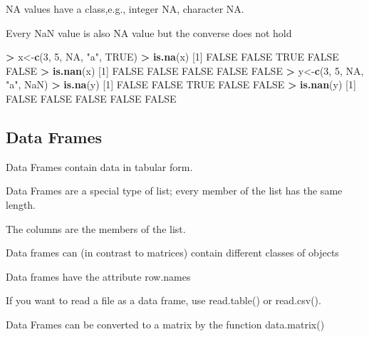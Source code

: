 \documentclass[]{article}
\newenvironment{Shaded}{\begin{snugshade}}{\end{snugshade}}
\newcommand{\KeywordTok}[1]{\textcolor[rgb]{0.13,0.29,0.53}{\textbf{#1}}}
\newcommand{\DecValTok}[1]{\textcolor[rgb]{0.00,0.00,0.81}{#1}}
\newcommand{\StringTok}[1]{\textcolor[rgb]{0.31,0.60,0.02}{#1}}
\newcommand{\OtherTok}[1]{\textcolor[rgb]{0.56,0.35,0.01}{#1}}
\newcommand{\OperatorTok}[1]{\textcolor[rgb]{0.81,0.36,0.00}{\textbf{#1}}}
\newcommand{\NormalTok}[1]{#1}
\begin{document}
NA values have a class,e.g., integer NA, character NA.

Every NaN value is also NA value but the converse does not hold

\begin{Shaded}
\begin{Highlighting}[]
\OperatorTok{>}\StringTok{  }\NormalTok{x<-}\KeywordTok{c}\NormalTok{(}\DecValTok{3}\NormalTok{, }\DecValTok{5}\NormalTok{, }\OtherTok{NA}\NormalTok{, }\StringTok{"a"}\NormalTok{, }\OtherTok{TRUE}\NormalTok{) }
\OperatorTok{>}\StringTok{ }\KeywordTok{is.na}\NormalTok{(x) }
\NormalTok{[}\DecValTok{1}\NormalTok{] }\OtherTok{FALSE} \OtherTok{FALSE}  \OtherTok{TRUE} \OtherTok{FALSE} \OtherTok{FALSE}
\OperatorTok{>}\StringTok{ }\KeywordTok{is.nan}\NormalTok{(x) }
\NormalTok{[}\DecValTok{1}\NormalTok{] }\OtherTok{FALSE} \OtherTok{FALSE} \OtherTok{FALSE} \OtherTok{FALSE} \OtherTok{FALSE}
\OperatorTok{>}\StringTok{ }\NormalTok{y<-}\KeywordTok{c}\NormalTok{(}\DecValTok{3}\NormalTok{, }\DecValTok{5}\NormalTok{, }\OtherTok{NA}\NormalTok{, }\StringTok{"a"}\NormalTok{, }\OtherTok{NaN}\NormalTok{) }
\OperatorTok{>}\StringTok{ }\KeywordTok{is.na}\NormalTok{(y) }
\NormalTok{[}\DecValTok{1}\NormalTok{] }\OtherTok{FALSE} \OtherTok{FALSE}  \OtherTok{TRUE} \OtherTok{FALSE} \OtherTok{FALSE}
\OperatorTok{>}\StringTok{ }\KeywordTok{is.nan}\NormalTok{(y) }
\NormalTok{[}\DecValTok{1}\NormalTok{] }\OtherTok{FALSE} \OtherTok{FALSE} \OtherTok{FALSE} \OtherTok{FALSE} \OtherTok{FALSE}
\end{Highlighting}
\end{Shaded}

\subsection{Data Frames}\label{data-frames}

Data Frames contain data in tabular form.

Data Frames are a special type of list; every member of the list has the
same length.

The columns are the members of the list.

Data frames can (in contrast to matrices) contain different classes of
objects

Data frames have the attribute row.names

If you want to read a file as a data frame, use read.table() or
read.csv().

Data Frames can be converted to a matrix by the function data.matrix()
\end{document}
